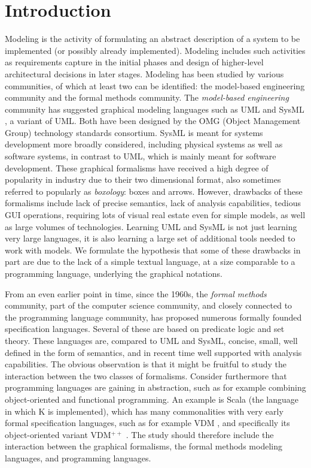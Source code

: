 \section{Introduction}
\label{sec:introduction}

Modeling is the activity of formulating an abstract description of a
system to be implemented (or possibly already implemented). Modeling
includes such activities as requirements capture in the initial phases
and design of higher-level architectural decisions in later
stages. Modeling has been studied by various communities, of which at
least two can be identified: the model-based engineering community and
the formal methods community. The {\em model-based engineering}
community has suggested graphical modeling languages such as UML
\cite{uml} and SysML \cite{sysml}, a variant of UML.  Both have been
designed by the OMG (Object Management Group) technology standards
consortium. SysML is meant for systems development more broadly
considered, including physical systems as well as software systems, in
contrast to UML, which is mainly meant for software development. These
graphical formalisms have received a high degree of popularity in
industry due to their two dimensional format, also sometimes referred
to popularly as {\em boxology}: boxes and arrows. However, drawbacks
of these formalisms include lack of precise semantics, lack of
analysis capabilities, tedious GUI operations, requiring lots
of visual real estate even for simple models, as well as large volumes
of technologies. Learning UML and SysML is not just learning very
large languages, it is also learning a large set of additional tools
needed to work with models. We formulate the hypothesis that some of these
drawbacks in part are due to the lack of a simple textual language, at
a size comparable to a programming language, underlying the
graphical notations.

From an even earlier point in time, since the 1960s, the {\em
  formal methods} community, part of the computer science community,
and closely connected to the programming language community, has
proposed numerous formally founded specification languages. Several of
these are based on predicate logic and set theory. These languages
are, compared to UML and SysML, concise, small, well defined in the
form of semantics, and in recent time well supported with analysis
capabilities. The obvious observation is that it might be fruitful to
study the interaction between the two classes of formalisms. Consider
furthermore that programming languages are gaining in abstraction,
such as for example combining object-oriented and functional
programming. An example is Scala (the language in which K is
implemented), which has many commonalities with very early formal
specification languages, such as for example VDM \cite{vdm78}, and
specifically its object-oriented variant VDM$^{++}$
\cite{vdmplusplus05}.  The study should therefore include the
interaction between the graphical formalisms, the formal methods
modeling languages, and programming languages.

